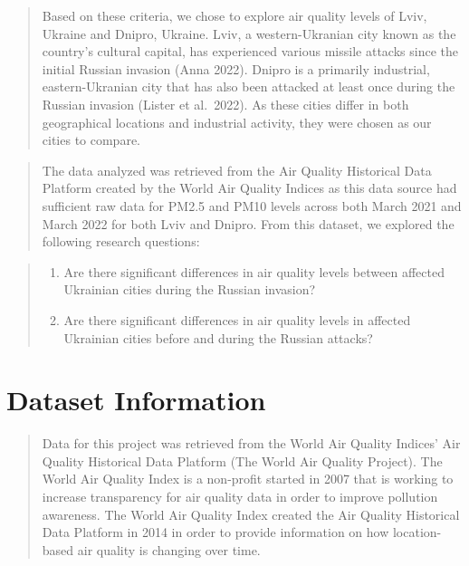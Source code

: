 \documentclass[
  12pt,
]{article}
\providecommand{\tightlist}{%
  \setlength{\itemsep}{0pt}\setlength{\parskip}{0pt}}
\begin{document}
\begin{quote}
Based on these criteria, we chose to explore air quality levels of Lviv,
Ukraine and Dnipro, Ukraine. Lviv, a western-Ukranian city known as the
country's cultural capital, has experienced various missile attacks
since the initial Russian invasion (Anna 2022). Dnipro is a primarily
industrial, eastern-Ukranian city that has also been attacked at least
once during the Russian invasion (Lister et al.~2022). As these cities
differ in both geographical locations and industrial activity, they were
chosen as our cities to compare.
\end{quote}

\begin{quote}
The data analyzed was retrieved from the Air Quality Historical Data
Platform created by the World Air Quality Indices as this data source
had sufficient raw data for PM2.5 and PM10 levels across both March 2021
and March 2022 for both Lviv and Dnipro. From this dataset, we explored
the following research questions:
\end{quote}

\begin{quote}
\begin{enumerate}
\def\labelenumi{\arabic{enumi})}
\tightlist
\item
  Are there significant differences in air quality levels between
  affected Ukrainian cities during the Russian invasion?
\item
  Are there significant differences in air quality levels in affected
  Ukrainian cities before and during the Russian attacks?
\end{enumerate}
\end{quote}

\newpage

\hypertarget{dataset-information}{%
\section{Dataset Information}\label{dataset-information}}

\begin{quote}
Data for this project was retrieved from the World Air Quality Indices'
Air Quality Historical Data Platform (The World Air Quality Project).
The World Air Quality Index is a non-profit started in 2007 that is
working to increase transparency for air quality data in order to
improve pollution awareness. The World Air Quality Index created the Air
Quality Historical Data Platform in 2014 in order to provide information
on how location-based air quality is changing over time.
\end{quote}
\end{document}
